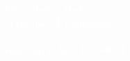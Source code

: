 \newcommand{\cccvname}{Jochen Mader}
\newcommand{\cccvjobtitle}{Principal IT Consultant}

\NoBgThispage
\AddToShipoutPicture*{\BackgroundPic}
\vspace*{18.5cm}
\noindent
\textcolor{white}{
{\Huge CV\_ \cccvname}\\[8pt]
{\huge (\cccvjobtitle)}\\
\\[8pt]
{\Large codecentric AG | \today}
}

